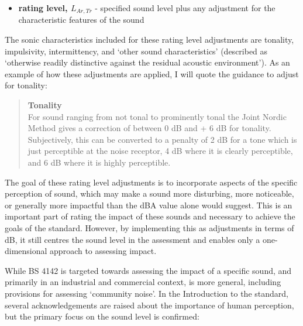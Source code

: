 \begin{itemize}
  \item \textbf{rating level, $L_{Ar,Tr}$} - specified sound level plus any adjustment for the characteristic features of the sound
\end{itemize}

The sonic characteristics included for these rating level adjustments are tonality, impulsivity, intermittency, and `other sound characteristics' (described as `otherwise readily distinctive against the residual acoustic environment'). As an example of how these adjustments are applied, I will quote the guidance to adjust for tonality:

\begin{quote}
  \textbf{Tonality} \\
  For sound ranging from not tonal to prominently tonal the Joint Nordic Method \citep{ISO1996Part1} gives a correction of between 0 dB and + 6 dB for tonality. Subjectively, this can be converted to a penalty of 2 dB for a tone which is just perceptible at the noise receptor, 4 dB where it is clearly perceptible, and 6 dB where it is highly perceptible.
      \begin{flushright}
    \citet[pg. 13]{BS41422019}
  \end{flushright}
\end{quote}

The goal of these rating level adjustments is to incorporate aspects of the specific perception of sound, which may make a sound more disturbing, more noticeable, or generally more impactful than the dBA value alone would suggest. This is an important part of rating the impact of these sounds and necessary to achieve the goals of the standard. However, by implementing this as adjustments in terms of dB, it still centres the sound level in the assessment and enables only a one-dimensional approach to assessing impact. 

While BS 4142 is targeted towards assessing the impact of a specific sound, and primarily in an industrial and commercial context, \citet{ISO1996Part1} is more general, including provisions for assessing `community noise'. In the Introduction to the standard, several acknowledgements are raised about the importance of human perception, but the primary focus on the sound level is confirmed:


